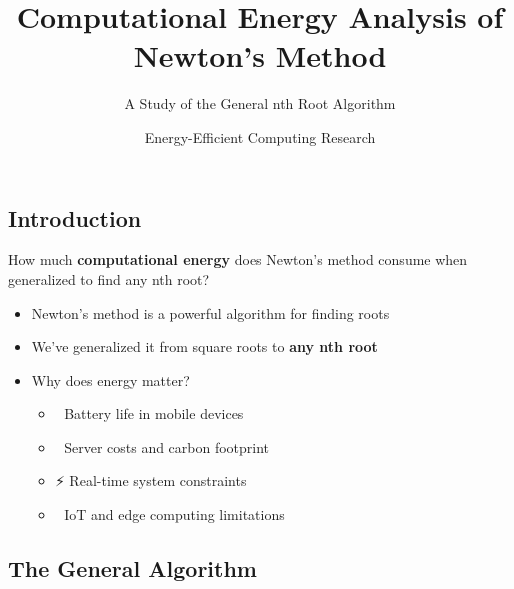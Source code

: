\documentclass[
  letterpaper,
  DIV=11,
  numbers=noendperiod]{scrartcl}
\title{Computational Energy Analysis of Newton's Method}
\subtitle{A Study of the General nth Root Algorithm}
\author{Energy-Efficient Computing Research}
\date{}
\providecommand{\tightlist}{%
  \setlength{\itemsep}{0pt}\setlength{\parskip}{0pt}}
\begin{document}
\maketitle


\subsection{Introduction}\label{introduction}

\begin{tcolorbox}[enhanced jigsaw, title=\textcolor{quarto-callout-note-color}{\faInfo}\hspace{0.5em}{Research Question}, coltitle=black, titlerule=0mm, breakable, arc=.35mm, leftrule=.75mm, rightrule=.15mm, toptitle=1mm, colback=white, colframe=quarto-callout-note-color-frame, colbacktitle=quarto-callout-note-color!10!white, bottomtitle=1mm, opacityback=0, toprule=.15mm, left=2mm, opacitybacktitle=0.6, bottomrule=.15mm]

How much \textbf{computational energy} does Newton's method consume when
generalized to find any nth root?

\end{tcolorbox}

\begin{itemize}
\tightlist
\item
  Newton's method is a powerful algorithm for finding roots
\item
  We've generalized it from square roots to {\textbf{any nth root}}
\item
  Why does energy matter?

  \begin{itemize}
  \tightlist
  \item
    🔋 Battery life in mobile devices
  \item
    🌱 Server costs and carbon footprint
  \item
    ⚡ Real-time system constraints
  \item
    📱 IoT and edge computing limitations
  \end{itemize}
\end{itemize}

\subsection{The General Algorithm}\label{the-general-algorithm}
\end{document}
